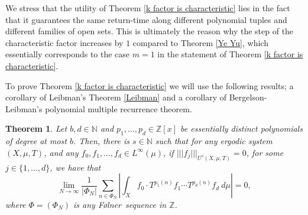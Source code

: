 \documentclass[reqno]{amsart}
\def\Z{{\mathbb Z}}
\def\N{{\mathbb N}}
\newcommand{\nnorm}[1]{\lvert\!|\!| #1|\!|\!\rvert}
\newtheorem{theorem}{Theorem}[section]
\theoremstyle{definition}
\theoremstyle{remark}
\def\N{{\mathbb N}}
\newcommand{\Folner}{F\o{}lner}
\begin{document}
We stress that the utility of Theorem 
\ref{k factor is characteristic} lies in the fact that it 
guarantees the same return-time along different polynomial tuples 
and different families of open sets. This is ultimately the reason 
why the step of the characteristic factor increases by $1$ 
compared to Theorem \ref{Ye Yu}, which essentially 
corresponds to the case $m=1$ in the statement of 
Theorem \ref{k factor is characteristic}.

To prove Theorem \ref{k factor is characteristic} we will use 
the following results; a corollary of Leibman's Theorem \ref{Leibman} and a corollary of Bergelson-Leibman's polynomial multiple recurrence theorem.

\begin{theorem}\label{k+1 factor is characteristic for ergodic averages}
Let $b,d \in \N$ and $p_1,\ldots,p_d\in \Z[x]$ be essentially 
distinct polynomials of degree at most $b$. 
Then, there is $s\in \N$ such that for any ergodic system 
$(X,\mu,T)$, and any $f_0,f_1,\ldots,f_d\in L^{\infty}(\mu)$, if 
$\nnorm{f_j}_{U^{s}(X,\mu,T)}=0$, for some $j\in \{1,\ldots,d\}$, we have that
\begin{equation}\label{ergodic averages for k+1}
\lim_{N\to \infty} \frac{1}{|\Phi_N|}\sum_{n\in \Phi_N} \left| \int_{X} f_0 \cdot T^{p_1(n)}f_1 \cdots T^{p_d(n)}f_d\ d\mu \right| =0,     
\end{equation}
where $\Phi=(\Phi_N)$ is any \Folner\ sequence in $\Z$.
\end{theorem}
\end{document}
